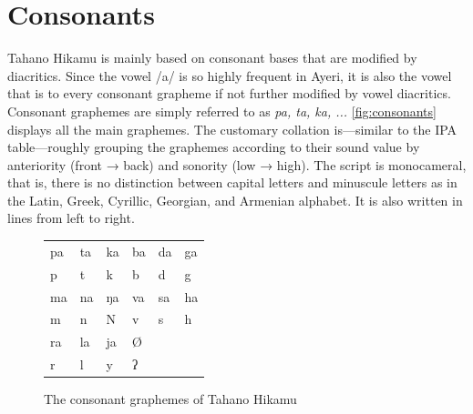 \section{Consonants}

Tahano Hikamu is mainly based on consonant 
bases that are modified by diacritics. Since the vowel /a/ is so highly 
frequent in Ayeri, it is also the vowel that is  to every consonant 
grapheme if not further modified by vowel diacritics. Consonant graphemes are 
simply referred to as \textit{pa, ta, ka, ...} \autoref{fig:consonants} displays 
all the main graphemes. The customary collation is---similar to the IPA 
table---roughly grouping the graphemes according to their sound value by 
anteriority (front → back) and sonority (low → high). The script is 
monocameral, that is, there is no distinction between capital letters and 
minuscule letters as in the Latin, Greek, Cyrillic, Georgian, and Armenian 
alphabet. It is also written in lines from left to right.


\begin{figure}[ht]
\caption{The consonant graphemes of Tahano Hikamu}

\begin{tabu} to \linewidth{X[c] X[c] X[c] X[c] X[c] X[c]}
\toprule
\tableheaderfont	pa & ta & ka & ba & da & ga \\
\rowfont{\Tagati\huge}	p & t & k & b & d & g \\

\midrule

\tableheaderfont	ma & na & ŋa & va & sa & ha \\
\rowfont{\Tagati\huge}	m & n & N & v & s & h \\

\midrule

\tableheaderfont	ra & la & ja & Ø \\
\rowfont{\Tagati\huge}	r & l & y & ʔ \\

\bottomrule
\end{tabu}
\label{fig:thcons}
\end{figure}

